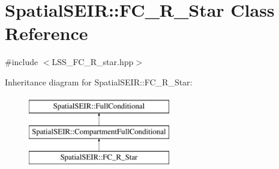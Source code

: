 \hypertarget{classSpatialSEIR_1_1FC__R__Star}{\section{Spatial\-S\-E\-I\-R\-:\-:F\-C\-\_\-\-R\-\_\-\-Star Class Reference}
\label{classSpatialSEIR_1_1FC__R__Star}
}


{\ttfamily \#include $<$L\-S\-S\-\_\-\-F\-C\-\_\-\-R\-\_\-star.\-hpp$>$}

Inheritance diagram for Spatial\-S\-E\-I\-R\-:\-:F\-C\-\_\-\-R\-\_\-\-Star\-:\begin{figure}[H]
\begin{center}
\leavevmode
\includegraphics[height=3.000000cm]{classSpatialSEIR_1_1FC__R__Star}
\end{center}
\end{figure}
